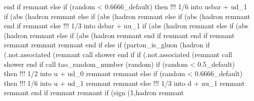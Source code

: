                    end if
                   remnant%
                else if (random < 0.6666_default) then
                   !!! 1/6 into usbar + ud_1
                   if (abs (hadron%
                      remnant%
                   else if (abs (hadron%
                      remnant%
                   else if (abs (hadron%
                      remnant%
                   end if
                   remnant%
                else
                   !!! 1/3 into dsbar + uu_1
                   if (abs (hadron%
                      remnant%
                   else if (abs (hadron%
                      remnant%
                   else if (abs (hadron%
                      remnant%
                   end if
                   remnant%
                end if
                remnant%
                remnant%
                remnant%
                remnant%
             end if
          else if (parton_is_gluon (hadron%
             if (.not.associated (remnant%
                call shower%
             end if
             if (.not.associated (remnant%
                call shower%
             end if
             call tao_random_number (random)
             if (random < 0.5_default) then
                !!! 1/2 into u + ud_0
                remnant%
                remnant%
             else if (random < 0.6666_default) then
                !!! 1/6 into u + ud_1
                remnant%
                remnant%
             else
                !!! 1/3 into d + uu_1
                remnant%
                remnant%
             end if
             remnant%
             remnant%
             if (sign (1,hadron%
                remnant%
